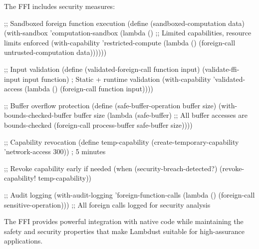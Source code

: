 
The FFI includes security measures:

\begin{example}
\begin{lambdustcode}
;; Sandboxed foreign function execution
(define (sandboxed-computation data)
  (with-sandbox 'computation-sandbox
    (lambda ()
      ;; Limited capabilities, resource limits enforced
      (with-capability 'restricted-compute
        (lambda ()
          (foreign-call untrusted-computation data))))))

;; Input validation
(define (validated-foreign-call function input)
  (validate-ffi-input input function)  ; Static + runtime validation
  (with-capability 'validated-access
    (lambda ()
      (foreign-call function input))))

;; Buffer overflow protection  
(define (safe-buffer-operation buffer size)
  (with-bounds-checked-buffer buffer size
    (lambda (safe-buffer)
      ;; All buffer accesses are bounds-checked
      (foreign-call process-buffer safe-buffer size))))

;; Capability revocation
(define temp-capability 
  (create-temporary-capability 'network-access 300))  ; 5 minutes

;; Revoke capability early if needed
(when (security-breach-detected?)
  (revoke-capability! temp-capability))

;; Audit logging
(with-audit-logging 'foreign-function-calls
  (lambda ()
    (foreign-call sensitive-operation)))
;; All foreign calls logged for security analysis
\end{lambdustcode}
\end{example}

The FFI provides powerful integration with native code while maintaining the safety and security properties that make Lambdust suitable for high-assurance applications.